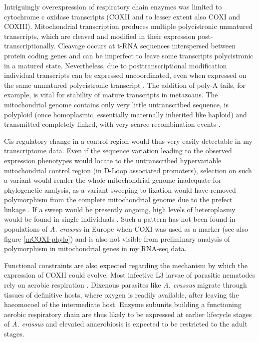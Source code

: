 Intriguingly overexpression of respiratory chain enzymes was limited
to cytochrome c oxidase transcripts (COXII and to lesser extent also
COXI and COXIII). Mitochondrial transcription produces multiple
polycistronic unmatured transcripts, which are cleaved and modified in
their expression post-transcriptionally. Cleavage occurs at t-RNA
sequences interspersed between protein coding genes and can be
imperfect to leave some transcripts polycistronic in a matured
state. Nevertheless, due to posttranscriptional modification
individual transcripts can be expressed uncoordinated, even when
expressed on the same unmatured polycistronic transcript
\cite{pmid19843606}. The addition of poly-A tails, for example, is
vital for stability of mature transcripts in metazoans. The
mitochondrial genome contains only very little untranscribed sequence,
is polyploid (once homoplasmic, essentially maternally inherited like
haploid) and transmitted completely linked, with very scarce
recombination events \cite{pmid18023115}.

Cis-regulatory change in a control region would thus very easily
detectable in my transcriptome data. Even if the sequence variation
leading to the observed expression phenotypes would locate to the
untranscribed hypervariable mitochondrial control region (in D-Loop
associated promoters), selection on such a variant would render the
whole mitochondrial genome inadequate for phylogenetic analysis, as a
variant sweeping to fixation would have removed polymorphism from the
complete mitochondrial genome due to the prefect linkage
\cite{pmid19821901}. If a sweep would be presently ongoing, high
levels of heteroplasmy would be found in single individuals
\cite{pmid21226948}. Such a pattern has not been found in populations
of \textit{A. crassus} in Europe when COXI was used as a marker
\cite{wielgoss_population_2008, dl_py} (see also figure
\ref{mCOXI-phylo}) and is also not visible from preliminary analysis
of polymorphism in mitochondrial genes in my RNA-seq data.

Functional constraints are also expected regarding the mechanism by
which the expression of COXII could evolve. Most infective L3 larvae
of parasitic nematodes rely on aerobic respiration
\cite{kennedy2001parasitic}. Dixenous parasites like
\textit{A. crassus} migrate through tissues of definitive hosts, where
oxygen is readily available, after leaving the haeomocoel of the
intermediate host. Enzyme subunits building a functioning aerobic
respiratory chain are thus likely to be expressed at earlier lifecycle
stages of \textit{A. crassus} and elevated anaerobiosis is expected to
be restricted to the adult stages.


